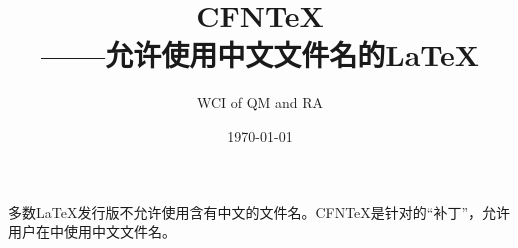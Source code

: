 \documentclass{ctexart}
\newcommand{\CFNTeX}{{CFN\TeX}}
\begin{document}
\title{\bf \CFNTeX\\\flushright\Large——允许使用中文文件名的\LaTeX}
\author{WCI of QM and RA}
\date{\today}
\maketitle

多数\LaTeX 发行版不允许使用含有中文的文件名。\CFNTeX 是针对\XeLaTeX 的“补丁”，允许用户在\XeLaTeX 中使用中文文件名。
\end{document}
